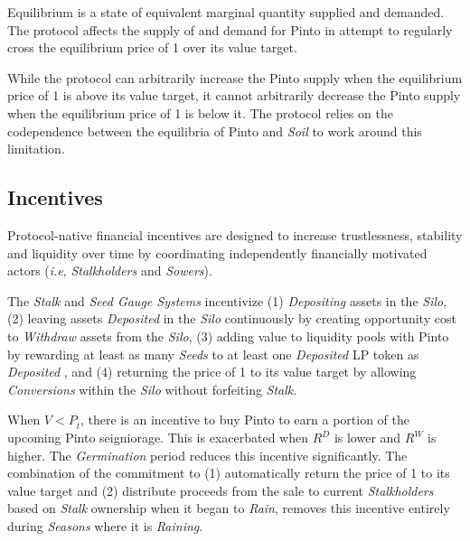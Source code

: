 \documentclass[tikz]{article}
\newcommand{\term}[1]{\textsl{#1}}
\newcommand{\Pinto}{} %
\begin{document}
Equilibrium is a state of equivalent marginal quantity supplied and demanded. The protocol affects the supply of and demand for Pinto in attempt to regularly cross the equilibrium price of \Pinto1 over its value target. 

\vspace{-0.15cm}

While the protocol can arbitrarily increase the Pinto supply when the equilibrium price of \Pinto1 is above its value target, it cannot arbitrarily decrease the Pinto supply when the equilibrium price of \Pinto1 is below it. The protocol relies on the codependence between the equilibria of Pinto and \term{Soil} to work around this limitation. 


\vspace{-0.15cm}
\subsection{Incentives}
\vspace{-0.15cm}

Protocol-native financial incentives are designed to increase trustlessness, stability and liquidity over time by coordinating independently financially motivated actors (\textit{i.e}, \term{Stalkholders} and \term{Sowers}). 

\vspace{-0.15cm}

The \term{Stalk} and \term{Seed Gauge Systems} incentivize (1) \term{Depositing} assets in the \term{Silo}, (2) leaving assets \term{Deposited} in the \term{Silo} continuously by creating opportunity cost to \term{Withdraw} assets from the \term{Silo}, (3) adding value to liquidity pools with Pinto by rewarding at least as many \term{Seeds} to at least one \term{Deposited} LP token as \term{Deposited} \Pinto, and (4) returning the price of \Pinto1 to its value target by allowing \term{Conversions} within the \term{Silo} without forfeiting \term{Stalk}.

\vspace{-0.15cm}

When $V < P_{\overline{t}}$, there is an incentive to buy Pinto to earn a portion of the upcoming Pinto seigniorage. This is exacerbated when $R^{D}$ is lower and $R^{W}$ is higher. The \term{Germination} period reduces this incentive significantly. The combination of the commitment to (1) automatically return the price of \Pinto1 to its value target and (2) distribute proceeds from the sale to current \term{Stalkholders} based on \term{Stalk} ownership when it began to \term{Rain}, removes this incentive entirely during \term{Seasons} where it is \term{Raining}.
\end{document}
